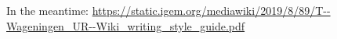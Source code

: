 
In the meantime: \url{https://static.igem.org/mediawiki/2019/8/89/T--Wageningen_UR--Wiki_writing_style_guide.pdf}